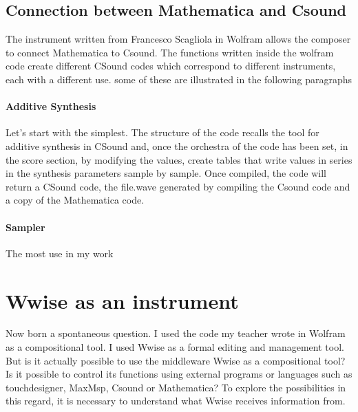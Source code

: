 		\subsection{Connection between Mathematica and Csound}
		The instrument written from Francesco Scagliola in Wolfram allows the composer to connect Mathematica to Csound.
		The functions written inside the wolfram code create different CSound codes which correspond to different instruments, each with a different use. some of these are illustrated in the following paragraphs
		
		\paragraph{Additive Synthesis} Let's start with the simplest.
		The structure of the code recalls the tool for additive synthesis in CSound and, once the orchestra of the code has been set, in the score section, by modifying the values, create tables that write values ​​in series in the synthesis parameters sample by sample. Once compiled, the code will return a CSound code, the file.wave generated by compiling the Csound code and a copy of the Mathematica code.
		
		\paragraph{Sampler} The most use in my work
		
	\section{Wwise as an instrument}
	Now born a spontaneous question. I used the code my teacher wrote in Wolfram as a compositional tool. I used Wwise as a formal editing and management tool.
	But is it actually possible to use the middleware Wwise as a compositional tool? Is it possible to control its functions using external programs or languages ​​such as touchdesigner, MaxMsp, Csound or Mathematica?
	To explore the possibilities in this regard, it is necessary to understand what Wwise receives information from.
	

